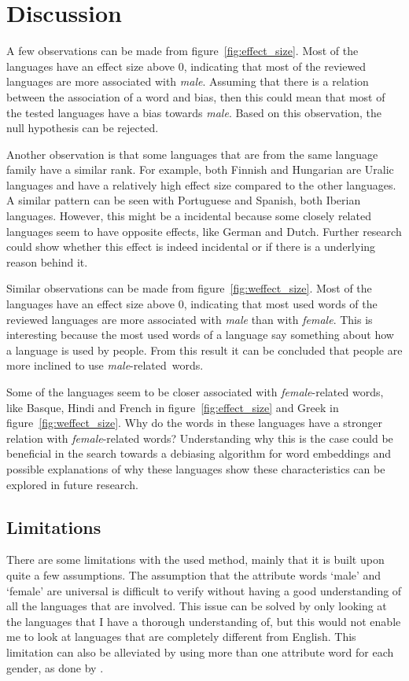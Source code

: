 \section{Discussion}
A few observations can be made from figure~\ref{fig:effect_size}. Most
of the languages have an effect size above 0, indicating that most of the reviewed
languages are more associated with \emph{male}. Assuming that there is a relation between
the association of a word and bias, then this could mean that
most of the tested languages have a bias towards \emph{male}. Based on this observation,
the null hypothesis can be rejected.

Another observation is that some languages that are from the same language family have
a similar rank. For example, both Finnish and Hungarian are Uralic languages and have a
relatively high effect size compared to the other languages. A similar pattern can be seen
with Portuguese and Spanish, both Iberian languages. However, this might be a incidental
because some closely related languages seem to have opposite effects, like German and
Dutch. Further research could show whether this effect is indeed incidental or if
there is a underlying reason behind it.

Similar observations can be made from figure~\ref{fig:weffect_size}. Most
of the languages have an effect size above 0, indicating that most used words of the
reviewed languages are more associated with \emph{male} than with \emph{female}. This
is interesting because the most used words of a language say something about how a
language is used by people.
From this result it can be concluded that people are more inclined to use
\mbox{\emph{male}-related words}.

Some of the languages seem to be closer associated with \emph{female}-related words, like
Basque, Hindi and French in figure~\ref{fig:effect_size} and Greek in
figure~\ref{fig:weffect_size}. Why do the words in these languages have a stronger
relation with \emph{female}-related words?
Understanding why this is
the case could be beneficial in the search towards a debiasing algorithm for word
embeddings and possible explanations of why these languages show these characteristics can
be explored in future research.


\subsection{Limitations}
There are some limitations with the used method, mainly that it is built upon quite a few
assumptions.
The assumption that the attribute words `male' and `female' are universal is difficult
to verify without having a good understanding of all the languages that are involved.
This issue can be solved by only looking at the languages that I have a thorough
understanding of, but this would not enable me to look at languages that are completely
different from English. This limitation can also be alleviated by using more than one
attribute word for each gender, as done by \textcite{caliskan_2017_semantics_language_corpora}.

